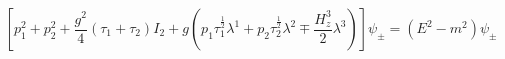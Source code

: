 \begin{equation}
\label{10}\left[ p_1^2+p_2^2+\frac{g^2}4\left( \tau _1+\tau _2\right)
I_2+g\left( p_1\tau _1^{\frac 12}\lambda ^1+p_2\tau _2^{\frac 12}\lambda
^2\mp \frac{H_z^3}2\lambda ^3\right) \right] \psi _{\pm }=\left(
E^2-m^2\right) \psi _{\pm } 
\end{equation}

